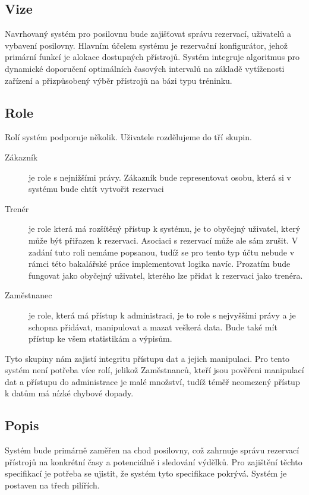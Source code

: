 \subsection{Vize}
Navrhovaný systém pro posilovnu bude zajišťovat správu rezervací, uživatelů a vybavení posilovny. Hlavním účelem systému je rezervační konfigurátor, jehož primární funkcí je alokace dostupných přístrojů. Systém integruje algoritmus pro dynamické doporučení optimálních časových intervalů na základě vytíženosti zařízení a přizpůsobený výběr přístrojů na bázi typu tréninku.

\subsection{Role}
Rolí systém podporuje několik. Uživatele rozdělujeme do tří skupin.

\begin{description}
    \item[Zákazník] je role s nejnižšími právy. Zákazník bude representovat osobu, která si v systému bude chtít vytvořit rezervaci
    \item[Trenér] je role která má rozšítěný přístup k systému, je to obyčejný uživatel, který může být přiřazen k rezervaci. Asociaci s rezervací může ale sám zrušit. V zadání tuto roli nemáme popsanou, tudíž se pro tento typ účtu nebude v rámci této bakalářské práce implementovat logika navíc. Prozatím bude fungovat jako obyčejný uživatel, kterého lze přidat k rezervaci jako trenéra.
    \item[Zaměstnanec] je role, která má přístup k administraci, je to role s nejvyššími právy a je schopna přidávat, manipulovat a mazat veškerá data. Bude také mít přístup ke všem statistikám a výpisům.
\end{description}
Tyto skupiny nám zajistí integritu přístupu dat a jejich manipulaci. Pro tento systém není potřeba více rolí, jelikož Zaměstnanců, kteří jsou pověřeni manipulací dat a přístupu do administrace je malé množství, tudíž téměř neomezený přístup k datům má nízké chybové dopady.

\subsection{Popis}
Systém bude primárně zaměřen na chod posilovny, což zahrnuje správu rezervací přístrojů na konkrétní časy a potenciálně i sledování výdělků. Pro zajištění těchto specifikací je potřeba se ujistit, že systém tyto specifikace pokrývá. Systém je postaven na třech pilířích.

